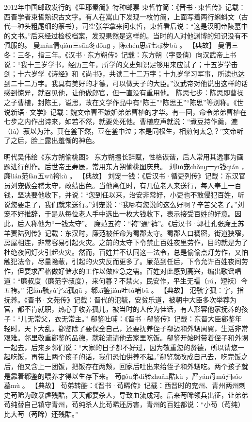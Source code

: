 \documentclass[12pt,UTF8]{ctexbook}
\begin{document}
2012年中国邮政发行的《里耶秦简》特种邮票
束皙竹简：《晋书·束皙传》记载：西晋学者束皙熟识古文字。有人在嵩山下发现一枚竹简，上面写着两行蝌蚪文（古代一种头粗尾细的篆书），司空张华拿来问束皙，束皙看后说：“这是汉明帝陵墓中的文书。”后来经过检校档案，发现果然是这样的。当时的人对他渊博的知识没有不佩服的。
曼màn倩qiàn三sān冬dōnɡ
，陈chén思sī七qī步bù
。
【典故】
曼倩三冬：三冬，指三年。《汉书·东方朔传》记载：东方朔（字曼倩）向汉武帝上书说：“我十三岁学书，经历三年，所学的文史知识足够用来应试了；十五岁学击剑；十六岁学《诗经》和《尚书》，共读二十二万字；十九岁学习军事，所读也达到二十二万字。我具有美好的才德，可以做天子的大臣。”汉武帝对他说出这样的话感到惊异，就召见他，让他做郎官，但一直没有重用他。
陈思七步：陈思即曹操之子曹植，封陈王，谥思，故在文学作品中有“陈王”“陈思王”“陈思”等别称。《世说新语·文学》记载：魏文帝曹丕嫉妒弟弟曹植的才华。有一回，命令弟弟曹植在七步之内作出诗来，如若不然，就要处死他。曹植应声就说：“煮豆持作羹，漉（lù）菽以为汁。萁在釜下然，豆在釜中泣；本是同根生，相煎何太急？”文帝听了之后，脸上露出羞惭的神色。

明代吴伟绘《东方朔偷桃图》
东方朔擅长辞赋，性格诙谐，后人常用其逸事为画题进行创作。后世帝王寿辰，常用东方朔偷桃图庆典。
刘liú宠chǒnɡ一yī钱qián
，廉lián范fàn五wǔ袴kù
。
【典故】
刘宠一钱：《后汉书·循吏列传》记载：东汉官员刘宠做会稽太守，政绩出色。当他离任时，有几位老人来送行，每人奉上一百钱，坚决要他收下，并说：“您到任以来，治安非常好，小吏也不敢侵犯百姓，听说您要走了，我们就来送行。”刘宠说：“我哪有您说的这么好啊？辛苦父老了。”刘宠不好推辞，于是从每位老人手中选出一枚大钱收下，表示接受百姓的好意。因此，后人称他为“一钱太守”。
廉范五袴：“袴”通“裤”。《后汉书·郭杜孔张廉王苏羊贾陆列传》记载：东汉时，廉范被任命为蜀郡太守。蜀郡人口稠密，街道狭窄，房屋相连，非常容易引起火灾。之前的太守下令禁止百姓夜里劳作，目的就是为了杜绝夜间灯火引起火灾。然而，百姓并不认同这一法令，总是偷偷点灯劳作，又怕触犯法令，尽量隐蔽，引起的火灾反而更多了。廉范到任后，下令允许百姓夜间劳作，但要求严格做好储水的工作以做应急之需。百姓对此感到高兴，编出歌谣唱道：“廉叔度（廉范字叔度），来何暮？不禁火，民安作，平生无襦（rú，短袄）今五袴。”
氾fán毓yù字zì孤ɡū
，郗xī鉴jiàn吐tǔ哺bǔ
。
【典故】
氾毓字孤：字，指抚养。《晋书·文苑传》记载：晋代的氾毓，安贫乐道，被朝中大臣多次举荐为官，都不肯就职，热心于收养孤儿，被当时的人传为佳话，有人形容他家抚养的孩子：“儿无常父，衣无常主。”
郗鉴吐哺：《晋书·郗鉴传》记载：东晋大臣郗鉴年轻时，天下大乱，郗鉴除了要保全自己，还要抚养侄子郗迈和外甥周翼，生活非常艰难。邻里敬重郗鉴的品德，就轮流请他去家里吃饭。郗鉴开始时带着侄子和外甥一起去，后来乡邻们说：“大家的日子都不好过，因为敬重您的贤德，所以请您一起吃饭，再带上两个孩子的话，我们恐怕供养不起。”郗鉴就改成自己去，吃完饭之后，他又含上一团饭，把饭存在两颊，回家后吐出来给侄子和外甥吃。两个孩子就是靠着郗鉴的喂养才得以生存下来。
苟ɡǒu弟dì转zhuǎn酷kù
，严yán母mǔ扫sǎo墓mù
。
【典故】
苟弟转酷：《晋书·苟晞传》记载：西晋时的兖州、青州两州刺史苟晞为政暴虐残酷，天天都要杀人，导致血流成河。后来苟晞领兵出征，让弟弟苟纯替自己镇守青州，苟纯杀人比苟晞还厉害，青州的百姓都说：“小苟（苟纯）比大苟（苟晞）还残酷。”
\end{document}
